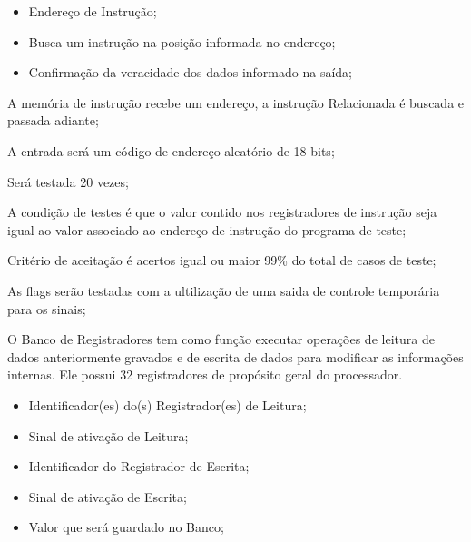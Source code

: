 \documentclass{article}
\begin{document}
  	\begin{itemize}
     \item Endereço de Instrução;
     \end{itemize}
    
  \actions
  \begin{itemize}
     \item Busca um instrução na posição informada no endereço;
    \end{itemize}
  
  \results
  	\begin{itemize}
     \item Confirmação da veracidade dos dados informado na saída;
    \end{itemize}
  
  \begin{mainflow}
    \item A memória de instrução recebe um endereço, a instrução
Relacionada é buscada e passada adiante;
    \item A entrada será um código de endereço aleatório  de 18 bits;
    
    \item Será testada 20 vezes;
    \item A condição de testes é que o valor contido nos registradores de instrução seja igual ao valor associado ao endereço de instrução do programa de teste;
    
    \item Critério de aceitação é acertos igual ou maior 99\% do total de casos de teste;
    \item As flags serão testadas com a ultilização de uma saida de controle temporária para os sinais;
  \end{mainflow}

O Banco de Registradores tem como função executar operações de 
leitura de dados anteriormente gravados e de escrita de dados para modificar as informações internas. Ele possui 32 registradores de propósito geral do processador.
  
  	\begin{itemize}
     \item Identificador(es) do(s) Registrador(es) de Leitura;
     \item Sinal de ativação de Leitura;
     \item Identificador do Registrador de Escrita;
     \item Sinal de ativação de Escrita;
     \item Valor que será guardado no Banco;
     \end{itemize}
    
\end{document}
